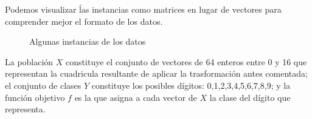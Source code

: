 \documentclass[a4]{article}
\begin{document}
Podemos visualizar ĺas instancias como matrices en lugar de vectores
para comprender mejor el formato de los datos.

\vspace{-5mm}
\begin{figure}[H]
  \centering
  \caption{Algunas instancias de los datos}
  \label{fig:samples}
\end{figure}
\vspace{-5mm}

La población $X$ constituye el conjunto de vectores de 64 enteros
entre 0 y 16 que representan la cuadricula resultante de aplicar la
trasformación antes comentada; el conjunto de clases $Y$ constituye
los posibles dígitos: 0,1,2,3,4,5,6,7,8,9; y la función objetivo $f$
es la que asigna a cada vector de $X$ la clase del dígito que
representa.
\end{document}
